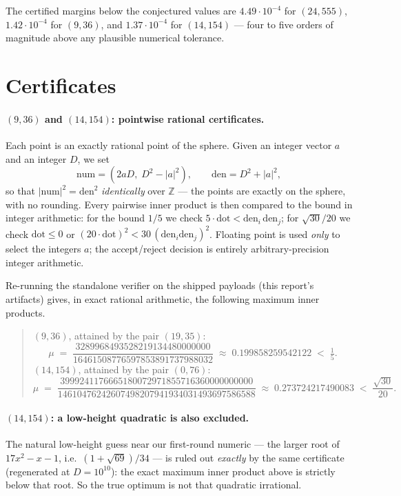 \documentclass[11pt,a4paper]{article}
\begin{document}
\noindent
The certified margins below the conjectured values are
$4.49\cdot10^{-4}$ for $(24,555)$,
$1.42\cdot10^{-4}$ for $(9,36)$, and
$1.37\cdot10^{-4}$ for $(14,154)$ --- four to five orders of magnitude above any
plausible numerical tolerance.

\section{Certificates}
\label{sec:certs}

\paragraph{$(9,36)$ and $(14,154)$: pointwise rational certificates.}
Each point is an exactly rational point of the sphere. Given an integer vector $a$ and
an integer $D$, we set
\[
\text{num} = (2aD,\; D^2-|a|^2), \qquad \text{den} = D^2+|a|^2,
\]
so that $|\text{num}|^2 = \text{den}^2$ \emph{identically} over $\mathbb{Z}$ --- the
points are exactly on the sphere, with no rounding. Every pairwise inner product is
then compared to the bound in integer arithmetic:
for the bound $1/5$ we check $5\cdot\text{dot} < \text{den}_i\,\text{den}_j$;
for $\sqrt{30}/20$ we check $\text{dot}\le 0$ or
$(20\cdot\text{dot})^2 < 30\,(\text{den}_i \text{den}_j)^2$.
Floating point is used \emph{only} to select the integers $a$; the accept/reject
decision is entirely arbitrary-precision integer arithmetic.

Re-running the standalone verifier on the shipped payloads (this report's artifacts)
gives, in exact rational arithmetic, the following maximum inner products.

\begin{quote}
$(9,36)$, attained by the pair $(19,35)$:
{\small
\[
\mu \;=\; \frac{3289968493528219134480000000}{16461508776597853891737988032}
\;\approx\; 0.199858259542122 \;<\; \tfrac15 .
\]}%
$(14,154)$, attained by the pair $(0,76)$:
{\footnotesize
\[
\mu \;=\; \frac{3999241176665180072971855716360000000000}
               {14610476242607498207941934031493697586588}
\;\approx\; 0.273724217490083 \;<\; \frac{\sqrt{30}}{20}.
\]}
\end{quote}

\paragraph{$(14,154)$: a low-height quadratic is also excluded.}
The natural low-height guess near our first-round numeric --- the larger root of
$17x^2-x-1$, i.e.\ $(1+\sqrt{69})/34$ --- is ruled out \emph{exactly} by the same
certificate (regenerated at $D=10^{10}$): the exact maximum inner product above is
strictly below that root. So the true optimum is not that quadratic irrational.
\end{document}
